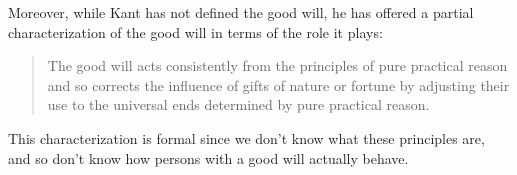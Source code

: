 Moreover, while Kant has not defined the good will, he has offered a partial characterization of the good will in terms of the role it plays:

\begin{quote}
	The good will acts consistently from the principles of pure practical reason and so corrects the influence of gifts of nature or fortune by adjusting their use to the universal ends determined by pure practical reason.
\end{quote}

This characterization is formal since we don’t know what these principles are, and so don’t know how persons with a good will actually behave.

% 


